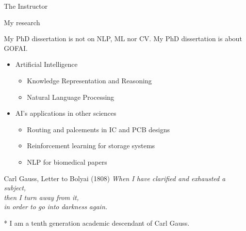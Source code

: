 \documentclass[11pt,handout]{beamer}
\begin{document}
\begin{frame}{The Instructor}
% 

\begin{block}{My research}

My PhD dissertation is not on NLP, ML nor CV. My PhD dissertation is about GOFAI. 

\pause 

\begin{itemize}
 \item Artificial Intelligence 
 \begin{itemize}
  \item Knowledge Representation and Reasoning
  \item Natural Language Processing
 \end{itemize}
 \item AI's applications in other sciences
 \begin{itemize}
  \item Routing and palcements in IC and PCB designs
  \item Reinforcement learning for storage systems 
  \item NLP for biomedical papers
 \end{itemize}
\end{itemize} 
\end{block}

\pause

\begin{block}{Carl Gauss, Letter to Bolyai (1808)}
\textit{When I have clarified and exhausted a subject,  \\
then I turn away from it,  \\
in order to go into darkness again.} 
\end{block}

 \pause

* I am a tenth generation academic descendant of Carl Gauss. 

\end{frame}
\end{document}
